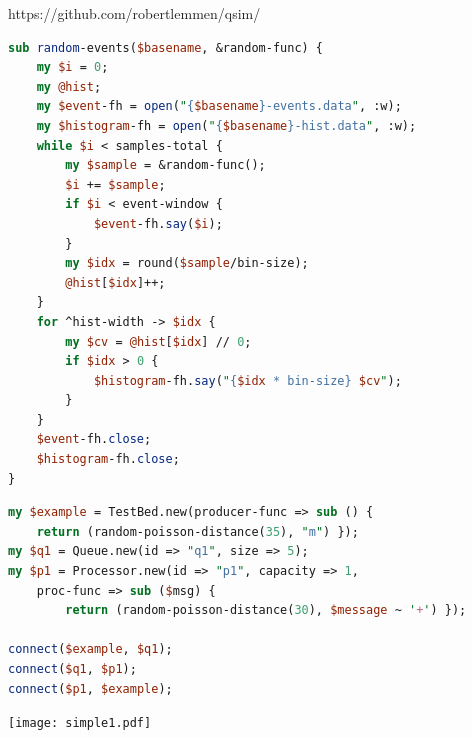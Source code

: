 \documentclass[12pt,a4paper,aspectratio=169]{beamer}
\begin{document}
{

\begin{frame}[fragile] 
{\color{blue}https://github.com/robertlemmen/qsim/}
\begin{lstlisting}[language=Perl,basicstyle=\footnotesize]
sub random-events($basename, &random-func) {
    my $i = 0;
    my @hist;
    my $event-fh = open("{$basename}-events.data", :w);
    my $histogram-fh = open("{$basename}-hist.data", :w);
    while $i < samples-total {
        my $sample = &random-func();
        $i += $sample;
        if $i < event-window {
            $event-fh.say($i);
        }
        my $idx = round($sample/bin-size); 
        @hist[$idx]++;
    }
    for ^hist-width -> $idx {
        my $cv = @hist[$idx] // 0;
        if $idx > 0 {
            $histogram-fh.say("{$idx * bin-size} $cv");
        }
    }
    $event-fh.close;
    $histogram-fh.close;
}
\end{lstlisting}
\end{frame}

\begin{frame}[fragile]
\vspace{.5em}
\begin{lstlisting}[language=Perl,basicstyle=\footnotesize]
my $example = TestBed.new(producer-func => sub () { 
    return (random-poisson-distance(35), "m") });
my $q1 = Queue.new(id => "q1", size => 5);
my $p1 = Processor.new(id => "p1", capacity => 1, 
    proc-func => sub ($msg) { 
        return (random-poisson-distance(30), $message ~ '+') });

connect($example, $q1);
connect($q1, $p1);
connect($p1, $example);
\end{lstlisting}
\vspace{.5em}
    \texttt{[image: simple1.pdf]}
\end{frame}





}
\end{document}
